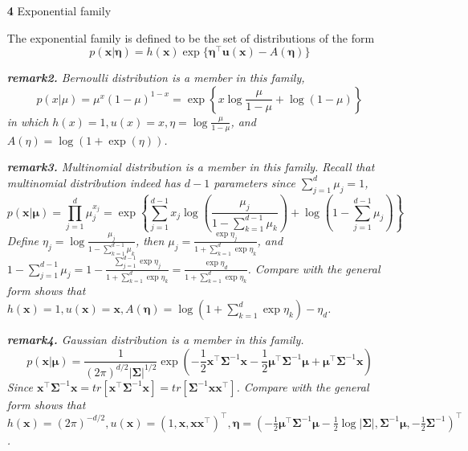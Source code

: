 \documentclass{article}
\begin{document}
\begin{itemize}
	\item [\textbf{4}] Exponential family
	
	The exponential family is defined to be the set of distributions of the form
	\begin{equation}
	p(\bm{x}|\bm{\eta}) = h(\bm{x}) \exp\{ \bm{\eta}^\top \bm{u}(\bm{x}) - A(\bm{\eta}) \}
	\end{equation}

	\begin{framed}
	\begin{scriptsize}
	\begin{spacing}{1.2}
	\noindent\textit{\textbf{remark2.} Bernoulli distribution is a member in this family,
	\begin{equation*}
	p(x|\mu) = \mu^x(1-\mu)^{1-x}  = \exp\left\{ x\log  \frac{\mu}{1-\mu}+ \log(1-\mu)\right\}
	\end{equation*}
in which $h(x)=1,u(x)=x, \eta=\log \frac{\mu}{1-\mu} $, and $A(\eta)=\log (1+\exp(\eta))$.}

	\noindent\textit{\textbf{remark3.} Multinomial distribution is a member in this family. Recall that multinomial distribution indeed has $d-1$ parameters since $\sum_{j=1}^d \mu_j = 1$,
	\begin{equation*}
	p(\bm{x}|\bm{\mu}) = \prod_{j=1}^d \mu_j^{x_j} 
	= \exp\left\{ \sum_{j=1}^{d-1} x_j \log \left( \frac{\mu_j}{1-\sum_{k=1}^{d-1} \mu_k} \right) +  \log \left(1-\sum_{j=1}^{d-1} \mu_j \right) \right\}
	\end{equation*}
	Define $\eta_j =  \log \frac{\mu_j}{1-\sum_{k=1}^{d-1} \mu_k}$, then $\mu_j = \frac{\exp\eta_j}{1+\sum_{k=1}^d \exp \eta_k}$, and $1-\sum_{j=1}^{d-1} \mu_j = 1-\frac{\sum_{j=1}^{d-1} \exp \eta_j}{1+\sum_{k=1}^d \exp \eta_k}=\frac{\exp \eta_{d}}{1+\sum_{k=1}^d \exp \eta_k}$. Compare with the general form shows that $h(\bm{x})=1, u(\bm{x})=\bm{x}, A(\bm{\eta})=\log (1+\sum_{k=1}^d \exp \eta_k)-\eta_d$.}
	
	\noindent\textit{\textbf{remark4.} Gaussian distribution is a member in this family.
	\begin{equation*}
	p(\bm{x}|\bm{\mu}) = \frac{1}{(2\pi)^{d/2} |\bm{\Sigma}|^{1/2}} \exp \left( -\frac{1}{2} \bm{x}^\top \bm{\Sigma}^{-1} \bm{x}  -\frac{1}{2} \bm{\mu}^\top \bm{\Sigma}^{-1} \bm{\mu} + \bm{\mu}^\top \bm{\Sigma}^{-1} \bm{x} \right)
	\end{equation*}
	Since $\bm{x}^\top \bm{\Sigma}^{-1} \bm{x} = tr [\bm{x}^\top \bm{\Sigma}^{-1} \bm{x}] = tr [\bm{\Sigma}^{-1} \bm{x} \bm{x}^\top ]$. Compare with the general form shows that $h(\bm{x})=(2\pi)^{-d/2}, u(\bm{x})=(1, \bm{x}, \bm{x}\bm{x}^\top)^\top, \bm{\eta}=(-\frac{1}{2} \bm{\mu}^\top \bm{\Sigma}^{-1} \bm{\mu}-\frac{1}{2}\log|\bm{\Sigma}|, \bm{\Sigma}^{-1}\bm{\mu}, -\frac{1}{2} \bm{\Sigma}^{-1})^\top$.}
	\end{spacing}
	\end{scriptsize}
	\end{framed}
	

\end{itemize}
\end{document}
